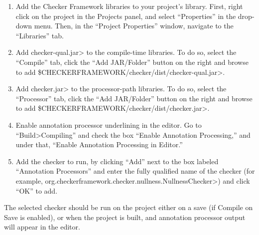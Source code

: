 
\begin{enumerate}
\item
  Add the Checker Framework libraries to your project's
  library. First, right click on the project in the Projects panel,
  and select ``Properties'' in the drop-down menu. Then, in the
  ``Project Properties'' window, navigate to the ``Libraries'' tab.

\item
  Add \<checker-qual.jar> to the compile-time libraries. To do so,
  select the ``Compile'' tab, click the ``Add JAR/Folder'' button on
  the right and browse to
  add \<\$CHECKERFRAMEWORK/checker/dist/checker-qual.jar>.

\item
  Add \<checker.jar> to the processor-path libraries. To do so, select
  the ``Processor'' tab, click the ``Add JAR/Folder'' button on the
  right and browse to
  add \<\$CHECKERFRAMEWORK/checker/dist/checker.jar>.

\item
  Enable annotation processor underlining in the editor. Go to
  ``Build>Compiling'' and check the box ``Enable Annotation
  Processing,'' and under that, ``Enable Annotation Processing in
  Editor.''

\item
  Add the checker to run, by clicking ``Add'' next to the box labeled
  ``Annotation Processors'' and enter the fully qualified name of the
  checker (for
  example, \<org.checkerframework.checker.nullness.NullnessChecker>)
  and click ``OK'' to add.
\end{enumerate}

The selected checker should be run on the project either on a save (if
Compile on Save is enabled), or when the project is built, and
annotation processor output will appear in the editor.



